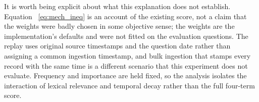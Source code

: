 It is worth being explicit about what this explanation does not establish. Equation
~\ref{eq:mech_ineq} is an account of the existing score, not a claim that the weights
were badly chosen in some objective sense; the weights are the implementation's
defaults and were not fitted on the evaluation questions. The replay uses original source
timestamps and the question date rather than assigning a common ingestion timestamp, and
bulk ingestion that stamps every record with the same time is a different scenario that
this experiment does not evaluate. Frequency and importance are held fixed, so the
analysis isolates the interaction of lexical relevance and temporal decay rather than the
full four-term score.

\FloatBarrier
